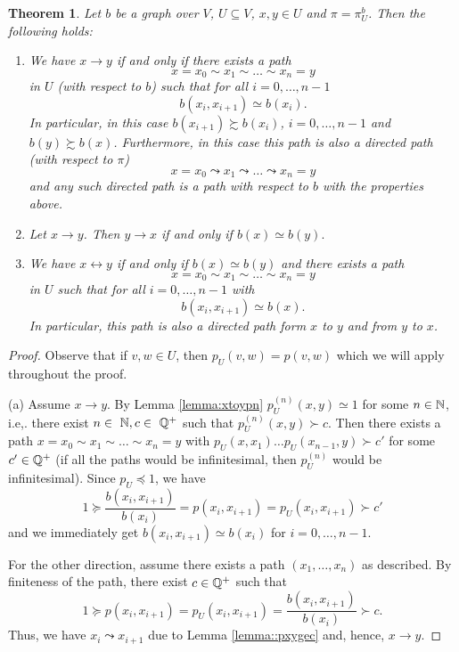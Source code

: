 \documentclass[a4paper,oneside, 12pt]{amsart}
\newtheorem{theorem}{Theorem}
\numberwithin{theorem}{section}
\theoremstyle{definition}
\newcommand{\subsV}{U}
\begin{document}
{\begin{theorem}\label{thm::bxby}
Let $b$ be a  graph over $V$, $\subsV\subseteq V$, $x,y\in \subsV$ and $\pi=\pi_\subsV^{b}$. Then the following holds:
\begin{enumerate}[label=${(\alph*)}$]
\item We have 
$x\to y$ if and only if there exists a path $$ x=x_0\sim x_1\sim\dots \sim x_n=y $$ in  $\subsV$ (with respect to $ b $) such that for all $ i=0,\ldots,n-1 $
 $$ b(x_i,x_{i+1})\simeq b(x_i). $$
In particular, in this case 
${b(x_{i+1})\succsim b(x_i)}$, $ i=0,\ldots,n-1$
and ${b(y)}\succsim{b(x)}$.
Furthermore, in this case this path is also a directed path (with respect to $ \pi $)
$$
x=x_0\leadsto x_1\leadsto\dots \leadsto x_n=y
$$
and any such directed path is a path with respect to $ b $ with the properties above. 
\item
Let $x\to y$. Then $y\to x$ if and only if  $b(x)\simeq b(y).$


\item
 We have  $x\leftrightarrow y$ if and only if $b(x)\simeq b(y)$ and there exists a path  $$ x=x_0\sim x_1\sim\dots \sim x_n=y $$ in  $\subsV$  such that for all $ i=0,\ldots,n-1 $
with $$ b(x_i,x_{i+1})\simeq b(x). $$ 
In particular, this path is also a directed path form  $ x $ to $ y $ and from $ y $ to $ x $.
\end{enumerate}
\end{theorem}


\begin{proof}
Observe that if $ v,w\in U $, then $ p_{U}(v,w)=p(v,w) $ which we will apply throughout the proof.

(a)
Assume $x\to y$. By Lemma \ref{lemma:xtoypn} $p_\subsV^{(n)}(x,y)\simeq 1$ for some $n\in \Bbb N$, i.e,. there exist $n\in ~\Bbb N, c\in~\Bbb Q^+$ such that $p_\subsV^{(n)}(x,y)\succ c$. Then there exists a path 
$
x=x_0\sim x_1\sim\dots \sim x_n=y
$
with $p_\subsV(x,x_1)\dots p_\subsV(x_{n-1},y)\succ c'$ for some $c'\in \Bbb Q^+$ (if all the paths would be infinitesimal, then $p_\subsV^{(n)}$ would be infinitesimal). 
Since $p_\subsV\preceq 1$, we have 
$$
1\succeq\dfrac{b(x_i,x_{i+1})}{b(x_i)}=p(x_i,x_{i+1})=p_\subsV(x_i,x_{i+1})\succ c'
$$
and we immediately get $b(x_i,x_{i+1})\simeq b(x_i)$ for  $ i=0,\ldots,n-1$. 

For the other direction, assume there exists a  path $
(x_1,\ldots,x_{n})$ as described. By finiteness of the  path,  there exist $c\in \Bbb Q^+$ such that
$$
1\succeq p(x_i,x_{i+1})=p_\subsV(x_i,x_{i+1})=\dfrac{b(x_i,x_{i+1})}{b(x_i)}\succ c.
$$
Thus, we have $x_i\leadsto x_{i+1}$ due to Lemma \ref{lemma::pxygec} and, hence, $x\to y$.


\end{proof}}
\end{document}
